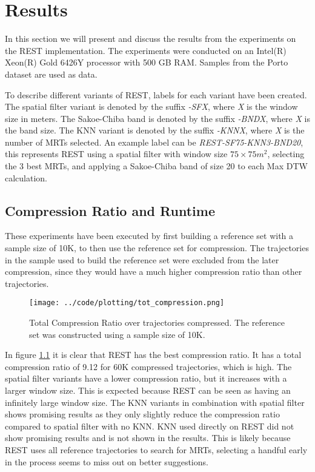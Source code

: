 \chapter{Results}
\label{chap:res}
In this section we will present and discuss the results from the experiments on the REST implementation. The experiments were conducted on an Intel(R) Xeon(R) Gold 6426Y processor with 500 GB RAM. Samples from the Porto dataset are used as data.

To describe different variants of REST, labels for each variant have been created. The spatial filter variant is denoted by the suffix \textit{-SFX}, where \textit{X} is the window size in meters. The Sakoe-Chiba band is denoted by the suffix \textit{-BNDX}, where \textit{X} is the band size. The KNN variant is denoted by the suffix \textit{-KNNX}, where \textit{X} is the number of MRTs selected. An example label can be \textit{REST-SF75-KNN3-BND20}, this represents REST using a spatial filter with window size $75\times75 m^2$, selecting the 3 best MRTs, and applying a Sakoe-Chiba band of size 20 to each Max DTW calculation.

\section{Compression Ratio and Runtime}
These experiments have been executed by first building a reference set with a sample size of 10K, to then use the reference set for compression. The trajectories in the sample used to build the reference set were excluded from the later compression, since they would have a much higher compression ratio than other trajectories.

\begin{figure}[h]
    \begin{minipage}{0.99\linewidth}
        \centering
        \texttt{[image: ../code/plotting/tot\_compression.png]}
        \caption{Total Compression Ratio over trajectories compressed. The reference set was constructed using a sample size of 10K.}
        \label{fig:n_compression}
    \end{minipage}
\end{figure}

In figure \ref{fig:n_compression} it is clear that REST has the best compression ratio. It has a total compression ratio of 9.12 for 60K compressed trajectories, which is high. The spatial filter variants have a lower compression ratio, but it increases with a larger window size. This is expected because REST can be seen as having an infinitely large window size. The KNN variants in combination with spatial filter shows promising results as they only slightly reduce the compression ratio compared to spatial filter with no KNN. KNN used directly on REST did not show promising results and is not shown in the results. This is likely because REST uses all reference trajectories to search for MRTs, selecting a handful early in the process seems to miss out on better suggestions.

